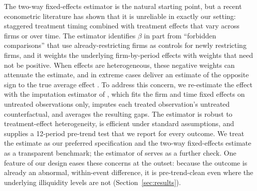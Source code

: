 \documentclass[12pt]{article}
\begin{document}
The two-way fixed-effects estimator is the natural starting point, but a recent econometric literature has shown that it is unreliable in exactly our setting: staggered treatment timing combined with treatment effects that vary across firms or over time. The estimator identifies $\beta$ in part from ``forbidden comparisons'' that use already-restricting firms as controls for newly restricting firms, and it weights the underlying firm-by-period effects with weights that need not be positive. When effects are heterogeneous, these negative weights can attenuate the estimate, and in extreme cases deliver an estimate of the opposite sign to the true average effect \citep{GoodmanBacon2021,deChaisemartinDHaultfoeuille2020}. To address this concern, we re-estimate the effect with the imputation estimator of \citet{BorusyakJaravelSpiess2024}, which fits the firm and time fixed effects on untreated observations only, imputes each treated observation's untreated counterfactual, and averages the resulting gaps. The estimator is robust to treatment-effect heterogeneity, is efficient under standard assumptions, and supplies a 12-period pre-trend test that we report for every outcome. We treat the \citet{BorusyakJaravelSpiess2024} estimate as our preferred specification and the two-way fixed-effects estimate as a transparent benchmark; the estimator of \citet{deChaisemartinDHaultfoeuille2024} serves as a further check. One feature of our design eases these concerns at the outset: because the outcome is already an abnormal, within-event difference, it is pre-trend-clean even where the underlying illiquidity levels are not (Section~\ref{sec:results}).

\end{document}
